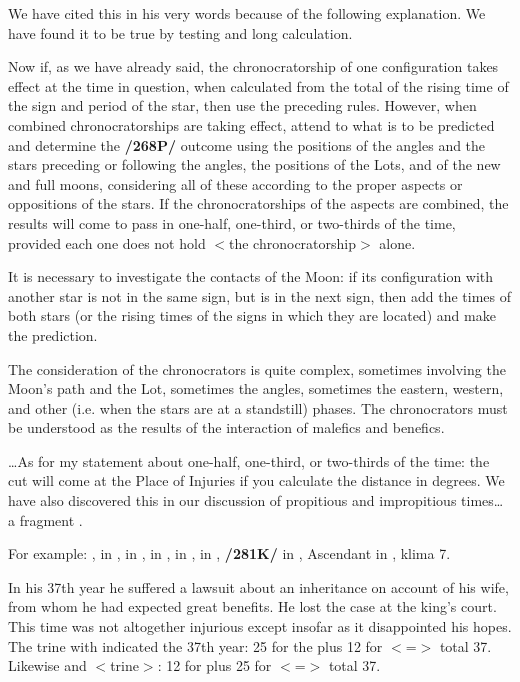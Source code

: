 We have cited this in his very words because of the following explanation. We have found it to be true by testing and long calculation.

Now if, as we have already said, the chronocratorship of one configuration takes effect at the time in question, when calculated from the total of the rising time of the sign and period of the star, then use the preceding rules. However, when combined chronocratorships are taking effect, attend to what is to be
predicted and determine the \textbf{/268P/} outcome using the positions of the angles and the stars preceding or following the angles, the positions of the Lots, and of the new and full moons, considering all of these according to the proper aspects or oppositions of the stars. 
If the chronocratorships of the aspects are combined, the results will come to pass in one-half, one-third, or two-thirds of the time, provided each one does not hold $<$the chronocratorship$>$ alone.

It is necessary to investigate the contacts of the Moon: if its configuration with another star is not in the same sign, but is in the next sign, then add the times of both stars (or the rising times of the signs in which they are located) and make the prediction. 

The consideration of the chronocrators is quite complex, sometimes involving the Moon’s path and the Lot, sometimes the angles, sometimes the eastern, western, and other (i.e. when the stars are at a standstill) phases. The chronocrators must be understood as the
results of the interaction of malefics and benefics.

…As for my statement about one-half, one-third, or two-thirds of the time: the cut will come at the Place of Injuries if you calculate the distance in degrees. We have also discovered this in our discussion of
propitious and impropitious times… a fragment .

For example: \Sun, \Moon\xspace in \Leo, \Saturn\xspace in \Virgo, \Jupiter\xspace in \Pisces, \Mars\xspace in \Sagittarius, \Venus\xspace in \Gemini, \textbf{/281K/} \Mercury\xspace in \Cancer, Ascendant in \Libra, klima 7. 

In his 37th year he suffered a lawsuit about an inheritance on account of his wife, from whom he had expected great benefits. He lost the case at the king’s court. This time was not altogether injurious except insofar as it disappointed his hopes. The \Moon\xspace trine with \Mars\xspace indicated the 37th year: 25 for the \Moon\xspace plus 12 for \Sagittarius\xspace $<$=\Jupiter$>$ total 37. Likewise \Jupiter\xspace and \Mercury\xspace $<$trine$>$: 12 for \Jupiter\xspace plus 25 for \Cancer\xspace $<$=\Moon$>$ total 37. 

